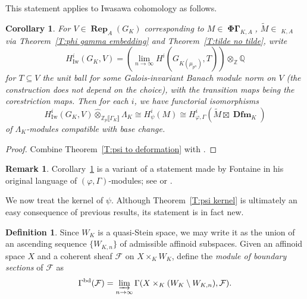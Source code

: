 \documentclass[12pt]{amsart}
\newtheorem{cor}[theorem]{Corollary}
\theoremstyle{definition}
\newtheorem{defn}[theorem]{Definition}
\newtheorem{remark}[theorem]{Remark}
\numberwithin{equation}{theorem}
\newcommand{\QQ}{\mathbb{Q}}
\newcommand{\ZZ}{\mathbb{Z}}
\newcommand{\calF}{\mathcal{F}}
\DeclareMathOperator{\bd}{bd}
\DeclareMathOperator{\Dfm}{\mathbf{Dfm}}
\DeclareMathOperator{\Iw}{Iw}
\DeclareMathOperator{\PhiGamma}{\mathbf{\Phi \Gamma}}
\DeclareMathOperator{\PhiGammatilde}{\widetilde{\mathbf{\Phi \Gamma}}}
\DeclareMathOperator{\Rep}{\mathbf{Rep}}
\begin{document}
This statement applies to Iwasawa cohomology as follows.
\begin{cor} \label{C:Iwasawa}
For $V \in \Rep_A(G_K)$ corresponding to $M \in \PhiGamma_{K,A}$,
$\tilde{M} \in \PhiGammatilde_{K,A}$ via 
Theorem~\ref{T:phi gamma embedding}
and Theorem~\ref{T:tilde no tilde},
write
\[
H^i_{\Iw}(G_K, V) = \left( \lim_{n \to \infty} H^i(G_{K(\mu_{p^n})}, T) \right) \otimes_{\ZZ} \QQ
\]
for $T \subseteq V$ the unit ball for some Galois-invariant Banach module norm on $V$
(the construction does not depend on the choice), with the transition maps being the corestriction maps. Then for each $i$, we have functorial isomorphisms
\[
H^i_{\Iw}(G_K, V) \widehat{\otimes}_{\ZZ_p\llbracket \Gamma_K \rrbracket} \Lambda_K \cong H^i_\psi(M) \cong H^i_{\varphi, \Gamma}(\tilde{M} \boxtimes \Dfm_K)
\]
of $\Lambda_K$-modules compatible with base change.
\end{cor}
\begin{proof}
Combine Theorem~\ref{T:psi to deformation} with \cite[Corollary~4.4.11]{kpx}.
\end{proof}

\begin{remark}
Corollary~\ref{C:Iwasawa} is a variant of a statement made by Fontaine in his original language of $(\varphi, \Gamma)$-modules; see \cite[\S II.1]{cherbonnier-colmez}
or \cite[Theorem~II.8]{berger-explicit}.
\end{remark}

We now treat the kernel of $\psi$. Although Theorem~\ref{T:psi kernel} is ultimately an easy consequence of previous results, its statement is in fact new.
\begin{defn}
Since $W_K$ is a quasi-Stein space, we may write it as the union of an ascending sequence $\{W_{K,n}\}$ of admissible affinoid subspaces. Given an affinoid space $X$ and a coherent sheaf $\calF$ on $X \times_K W_K$, define the \emph{module of boundary sections} of $\calF$ 
as 
\[
\Gamma^{\bd}(\calF) = 
\varinjlim_{n \to \infty} \Gamma(X \times_K (W_K \setminus W_{K,n}), \calF).
\]
\end{defn}
\end{document}
